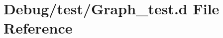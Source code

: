 \hypertarget{_graph__test_8d}{}\section{Debug/test/\+Graph\+\_\+test.d File Reference}
\label{_graph__test_8d}
